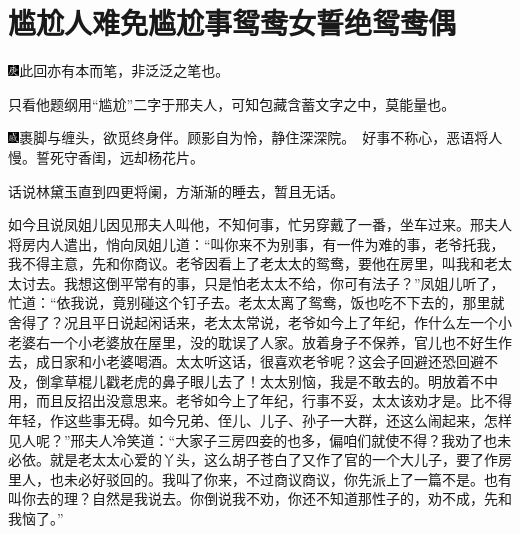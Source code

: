 

\chapter{尴尬人难免尴尬事\hspace{.5em}鸳鸯女誓绝鸳鸯偶}

{\includegraphics[width=3mm]{../Images/00004}此回亦有本而笔，非泛泛之笔也。}

{只看他题纲用``尴尬''二字于邢夫人，可知包藏含蓄文字之中，莫能量也。}

{\includegraphics[width=3mm]{../Images/00005}裹脚与缠头，欲觅终身伴。顾影自为怜，静住深深院。　好事不称心，恶语将人慢。誓死守香闺，远却杨花片。}

话说林黛玉直到四更将阑，方渐渐的睡去，暂且无话。

如今且说凤姐儿因见邢夫人叫他，不知何事，忙另穿戴了一番，坐车过来。邢夫人将房内人遣出，悄向凤姐儿道：``叫你来不为别事，有一件为难的事，老爷托我，我不得主意，先和你商议。老爷因看上了老太太的鸳鸯，要他在房里，叫我和老太太讨去。我想这倒平常有的事，只是怕老太太不给，你可有法子？''凤姐儿听了，忙道：``依我说，竟别碰这个钉子去。老太太离了鸳鸯，饭也吃不下去的，那里就舍得了？况且平日说起闲话来，老太太常说，老爷如今上了年纪，作什么左一个小老婆右一个小老婆放在屋里，没的耽误了人家。放着身子不保养，官儿也不好生作去，成日家和小老婆喝酒。太太听这话，很喜欢老爷呢？这会子回避还恐回避不及，倒拿草棍儿戳老虎的鼻子眼儿去了！太太别恼，我是不敢去的。明放着不中用，而且反招出没意思来。老爷如今上了年纪，行事不妥，太太该劝才是。比不得年轻，作这些事无碍。如今兄弟、侄儿、儿子、孙子一大群，还这么闹起来，怎样见人呢？''邢夫人冷笑道：``大家子三房四妾的也多，偏咱们就使不得？我劝了也未必依。就是老太太心爱的丫头，这么胡子苍白了又作了官的一个大儿子，要了作房里人，也未必好驳回的。我叫了你来，不过商议商议，你先派上了一篇不是。也有叫你去的理？自然是我说去。你倒说我不劝，你还不知道那性子的，劝不成，先和我恼了。''

